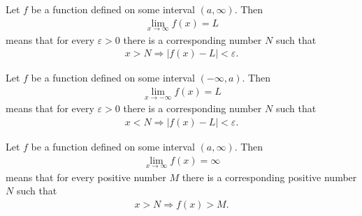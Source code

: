 \documentclass{article}
\begin{document}
\begin{definition}
    Let $f$ be a function defined on some interval $(a, \infty)$. Then
    \begin{align*}
        \lim_{x\to\infty}f(x)=L
    \end{align*}
    means that for every $\varepsilon>0$ there is a corresponding number $N$ such that
    \begin{align*}
        x>N\Rightarrow|f(x)-L|<\varepsilon.
    \end{align*}
\end{definition}
\begin{definition}
    Let $f$ be a function defined on some interval $(-\infty, a)$. Then
    \begin{align*}
        \lim_{x\to-\infty}f(x)=L
    \end{align*}
    means that for every $\varepsilon>0$ there is a corresponding number $N$ such that
    \begin{align*}
        x<N\Rightarrow |f(x)-L|<\varepsilon.
    \end{align*}
\end{definition}
\begin{definition}
    Let $f$ be a function defined on some interval $(a, \infty)$. Then
    \begin{align*}
        \lim_{x\to\infty}f(x)=\infty
    \end{align*}
    means that for every positive number $M$ there is a corresponding positive number $N$ such that
    \begin{align*}
        x>N\Rightarrow f(x)>M.
    \end{align*}
\end{definition}
\end{document}

